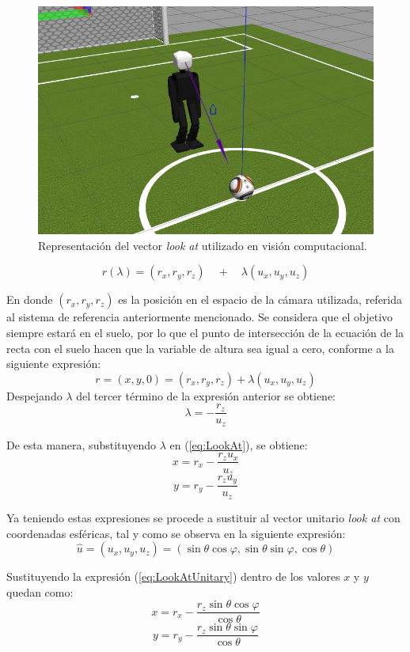 \begin{figure}
	\centering		
	\includegraphics[scale=2]{images/robot_lookat.png}
	\caption{Representación del vector \textit{look at} utilizado en visión computacional.}		
	\label{fig:LookAt}
\end{figure}

\begin{equation}
\label{eq:LookAt}
r(\lambda) = (r_x, r_y, r_z)\quad +\quad \lambda (u_x, u_y, u_z)
\end{equation}


En donde $(r_x, r_y, r_z)$ es la posición en el espacio de la cámara utilizada, referida al sistema de referencia anteriormente mencionado. Se considera que el objetivo siempre estará en el suelo, por lo que el punto de intersección de la ecuación de la recta con el suelo hacen que la variable de altura sea igual a cero, conforme a la siguiente expresión:
\[r = (x, y, 0) = (r_x, r_y, r_z) + \lambda (u_x, u_y, u_z)\]
Despejando $\lambda$ del tercer término de la expresión anterior se obtiene:
\[\lambda = -\frac{r_z}{u_z}\]

De esta manera, substituyendo $\lambda$ en (\ref{eq:LookAt}), se obtiene:
\[x = r_x-\frac{r_z u_x}{u_z}\]
\[y = r_y-\frac{r_z u_y}{u_z}\]

Ya teniendo estas expresiones se procede a sustituir al vector unitario \textit{look at} con coordenadas esféricas, tal y como se observa en la siguiente expresión:
\begin{equation}
\label{eq:LookAtUnitary}
\hat{u}=(u_x, u_y, u_z)=(\sin{ \theta}\cos{\varphi},\sin{\theta}\sin{ \varphi},\cos{\theta})
\end{equation}

Sustituyendo la expresión (\ref{eq:LookAtUnitary}) dentro de los valores $x$ y $y$ quedan como:
\[x=r_x - \frac{r_z \sin{ \theta} \cos{\varphi}}{\cos{\theta}}\]
\[y=r_y - \frac{r_z \sin{\theta} \sin{ \varphi}}{\cos{\theta}}\]

